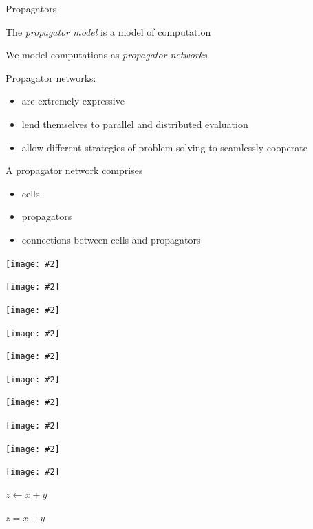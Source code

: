 \documentclass[usenames,dvipsnames,svgnames,table,aspectratio=1610,mathserif]{beamer}
\newcommand{\nl}{\vspace{\baselineskip}}
\newcommand{\pnl}{\pause \nl}
\newcommand{\imageslide}[2][1]{{
\begin{frame}\begin{center}
\texttt{[image: \#2]}
\end{center}\end{frame}
}}
\begin{document}
\begin{frame}

\begin{center}
{\Huge Propagators}
\end{center}

\end{frame}


\begin{frame}
The {\it propagator model} is a model of computation

We model computations as {\it propagator networks}

\pnl

Propagator networks:
\begin{itemize}
\item are extremely expressive
\item lend themselves to parallel and distributed evaluation
\item allow different strategies of problem-solving to seamlessly cooperate
\end{itemize}
\end{frame}


\begin{frame}

A propagator network comprises
\begin{itemize}
\item cells
\item propagators
\item connections between cells and propagators
\end{itemize}

\end{frame}


\imageslide{cell1.pdf}
\imageslide{cell2.pdf}
\imageslide{prop.pdf}

\imageslide{upper1.pdf}
\imageslide{upper2.pdf}
\imageslide{upper3.pdf}

\imageslide{add1.pdf}
\imageslide{add2.pdf}
\imageslide{add3.pdf}
\imageslide{add4.pdf}




\begin{frame}
  \begin{center}
    \begin{LARGE}
      $z \leftarrow x + y$
    \end{LARGE}
  \end{center}
\end{frame}


\begin{frame}
  \begin{center}
    \begin{LARGE}
      $z = x + y$
    \end{LARGE}
  \end{center}
\end{frame}
\end{document}
